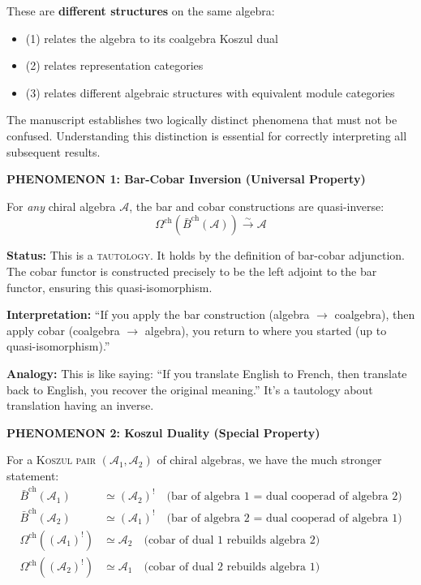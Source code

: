 These are \textbf{different structures} on the same algebra:
\begin{itemize}
\item (1) relates the algebra to its coalgebra Koszul dual
\item (2) relates representation categories
\item (3) relates different algebraic structures with equivalent module categories
\end{itemize}


\begin{remark}\label{rem:inversion-vs-duality-distinguished}
The manuscript establishes two logically distinct phenomena that must not be confused. Understanding this distinction is essential for correctly interpreting all subsequent results.

\medskip
\noindent\textbf{PHENOMENON 1: Bar-Cobar Inversion (Universal Property)}

For \emph{any} chiral algebra $\mathcal{A}$, the bar and cobar constructions are quasi-inverse:
$$\Omega^{\text{ch}}(\bar{B}^{\text{ch}}(\mathcal{A})) \xrightarrow{\sim} \mathcal{A}$$

\textbf{Status:} This is a \textsc{tautology}. It holds by the definition of bar-cobar adjunction. The cobar functor is constructed precisely to be the left adjoint to the bar functor, ensuring this quasi-isomorphism.

\textbf{Interpretation:} ``If you apply the bar construction (algebra $\to$ coalgebra), then apply cobar (coalgebra $\to$ algebra), you return to where you started (up to quasi-isomorphism).''

\textbf{Analogy:} This is like saying: ``If you translate English to French, then translate back to English, you recover the original meaning.'' It's a tautology about translation having an inverse.

\medskip
\noindent\textbf{PHENOMENON 2: Koszul Duality (Special Property)}

For a \textsc{Koszul pair} $(\mathcal{A}_1, \mathcal{A}_2)$ of chiral algebras, we have the much stronger statement:
\begin{align*}
\bar{B}^{\text{ch}}(\mathcal{A}_1) &\simeq (\mathcal{A}_2)^! \quad \text{(bar of algebra 1 = dual cooperad of algebra 2)} \\
\bar{B}^{\text{ch}}(\mathcal{A}_2) &\simeq (\mathcal{A}_1)^! \quad \text{(bar of algebra 2 = dual cooperad of algebra 1)} \\
\Omega^{\text{ch}}((\mathcal{A}_1)^!) &\simeq \mathcal{A}_2 \quad \text{(cobar of dual 1 rebuilds algebra 2)} \\
\Omega^{\text{ch}}((\mathcal{A}_2)^!) &\simeq \mathcal{A}_1 \quad \text{(cobar of dual 2 rebuilds algebra 1)}
\end{align*}


\end{remark}
